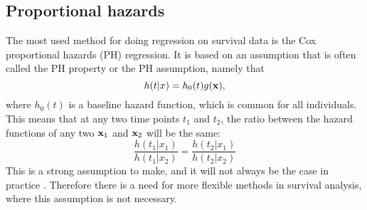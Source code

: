 \subsection{Proportional hazards}
The most used method for doing regression on survival data is the Cox proportional hazards (PH) regression. It is based on an assumption that is often called the PH property or the PH assumption, namely that
\begin{equation}
    h(t|x)=h_0(t)g(\mathbf{x}),
\end{equation}
where $h_0(t)$ is a baseline hazard function, which is common for all individuals. This means that at any two time points $t_1$ and $t_2$, the ratio between the hazard functions of any two $\mathbf{x}_1$ and $\mathbf{x}_2$ will be the same:
\begin{equation}
    \frac{h(t_1|x_1)}{h(t_1|x_2)}=\frac{h(t_2|x_1)}{h(t_2|x_2)}
\end{equation}
This is a strong assumption to make, and it will not always be the case in practice \citep{lee2010}. Therefore there is a need for more flexible methods in survival analysis, where this assumption is not necessary.

